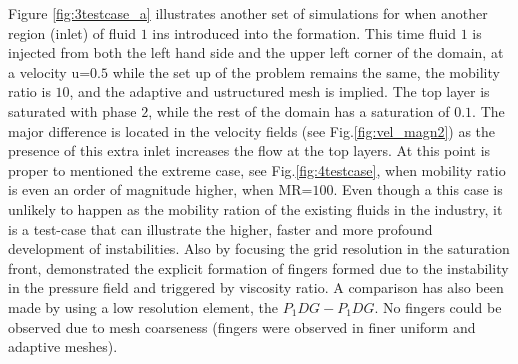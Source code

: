 \documentclass[preprint,authoryear,12pt]{elsarticle}
\begin{document}
\medskip
Figure \ref{fig:3testcase_a} illustrates another set of simulations for when another region (inlet) of fluid $1$ ins introduced into the formation. This time fluid $1$ is injected from both the left hand side and the upper left corner of the domain, at a velocity u=$0.5$ while the set up of the problem remains the same, the mobility ratio is $10$, and the adaptive and ustructured mesh is implied. The top layer is saturated with phase $2$, while the rest of the domain has a saturation of $0.1$. The major difference is located in the velocity fields (see Fig.\ref{fig:vel_magn2}) as the presence of this extra inlet increases the flow at the top layers. At this point is proper to mentioned the extreme case, see Fig.\ref{fig:4testcase}, when mobility ratio is even an order of magnitude higher, when MR=$100$. Even though a this case is unlikely to happen as the mobility ration of the existing fluids in the industry, it is a test-case that can illustrate the higher, faster and more profound development of instabilities. Also by focusing the grid resolution in the saturation front, \citet{christou_2015}  demonstrated the explicit formation of fingers formed due to the instability in the pressure ﬁeld and triggered by viscosity ratio. A comparison has also been made by using a low resolution element, the $P_{1}DG-P_{1}DG$. No fingers could be observed due to mesh coarseness (fingers were observed in ﬁner uniform and adaptive meshes).



\end{document}
